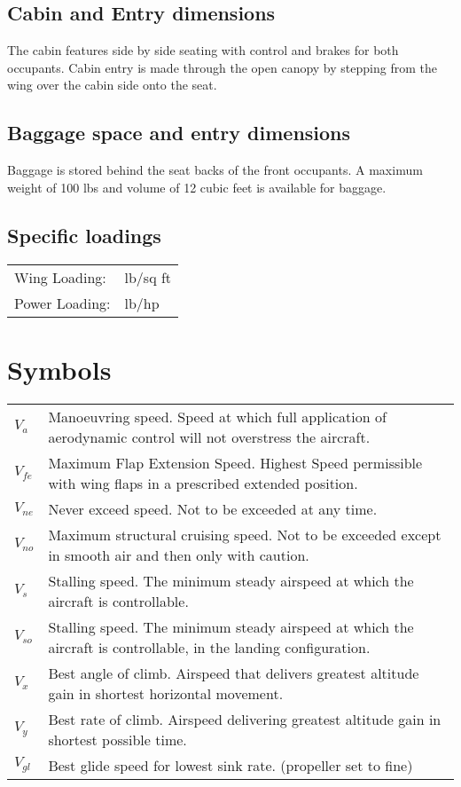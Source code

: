 \subsection{Cabin and Entry dimensions}
The cabin features side by side seating with control and  brakes for both occupants.   Cabin entry is made through the open canopy by stepping from the wing over the cabin side onto the seat.

\subsection{Baggage space and entry dimensions}
Baggage is stored behind the seat backs of the front occupants.  A maximum weight of 100 lbs and volume of 12 cubic feet is available for baggage.

\subsection{Specific loadings}
  \begin{tabularx}{\linewidth}{
    >{\hsize=0.4\hsize}X
    >{\hsize=0.6\hsize}X  }
Wing Loading: & 14.8 lb/sq ft\\
Power Loading: & 9.0 lb/hp \\
\end{tabularx}

\section{Symbols}
  \begin{tabularx}{\linewidth}{
    >{\hsize=0.2\hsize}X
    >{\hsize=0.8\hsize}X  }
$V_{a}$    & Manoeuvring speed. Speed at which full application of aerodynamic control will not overstress the aircraft. \\
$V_{fe}$ & Maximum Flap Extension Speed. Highest Speed permissible with wing flaps in a prescribed extended position. \\
$V_{ne}$ & Never exceed speed. Not to be exceeded at any time. \\
$V_{no}$ & Maximum structural cruising speed. Not to be exceeded except in smooth air and then only with caution.\\ 
$V_{s}$  & Stalling speed. The minimum steady airspeed at which the aircraft is controllable. \\
$V_{so}$ & Stalling speed. The minimum steady airspeed at which the aircraft is controllable, in the landing configuration. \\
$V_{x}$  & Best angle of climb. Airspeed that delivers greatest altitude gain in shortest horizontal movement. \\
$V_{y}$  & Best rate of climb. Airspeed delivering greatest altitude gain in shortest possible time.\\
$V_{gl}$ & Best glide speed for lowest sink rate. (propeller set to fine)\\
\end{tabularx}

